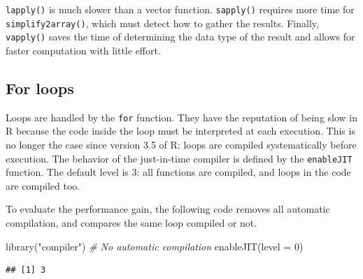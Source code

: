 \documentclass[
  12pt,
  american,
  a4paper,
  extrafontsizes,onecolumn,openright
  ]{memoir}
\newenvironment{Shaded}{\begin{snugshade}}{\end{snugshade}}
\newcommand{\AttributeTok}[1]{\textcolor[rgb]{0.77,0.63,0.00}{#1}}
\newcommand{\CommentTok}[1]{\textcolor[rgb]{0.56,0.35,0.01}{\textit{#1}}}
\newcommand{\DecValTok}[1]{\textcolor[rgb]{0.00,0.00,0.81}{#1}}
\newcommand{\FunctionTok}[1]{\textcolor[rgb]{0.00,0.00,0.00}{#1}}
\newcommand{\NormalTok}[1]{#1}
\newcommand{\StringTok}[1]{\textcolor[rgb]{0.31,0.60,0.02}{#1}}
\newlength{\rf}
\begin{document}
\normalsize

\texttt{lapply()} is much slower than a vector function.
\texttt{sapply()} requires more time for \texttt{simplify2array()}, which must detect how to gather the results.
Finally, \texttt{vapply()} saves the time of determining the data type of the result and allows for faster computation with little effort.

\hypertarget{for-loops}{%
\subsection{For loops}\label{for-loops}}

Loops are handled by the \texttt{for} function.
They have the reputation of being slow in R because the code inside the loop must be interpreted at each execution.
This is no longer the case since version 3.5 of R: loops are compiled systematically before execution.
The behavior of the just-in-time compiler is defined by the \texttt{enableJIT} function.
The default level is 3: all functions are compiled, and loops in the code are compiled too.

To evaluate the performance gain, the following code removes all automatic compilation, and compares the same loop compiled or not.

\scriptsize

\begin{Shaded}
\begin{Highlighting}[]
\FunctionTok{library}\NormalTok{(}\StringTok{"compiler"}\NormalTok{)}
\CommentTok{\# No automatic compilation}
\FunctionTok{enableJIT}\NormalTok{(}\AttributeTok{level =} \DecValTok{0}\NormalTok{)}
\end{Highlighting}
\end{Shaded}

\begin{verbatim}
## [1] 3
\end{verbatim}
\end{document}
